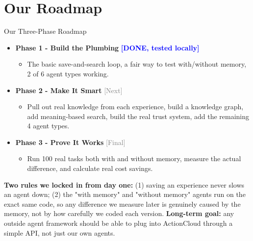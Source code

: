 \documentclass{beamer}
\begin{document}
\section{Our Roadmap}
\begin{frame}{Our Three-Phase Roadmap}
    \begin{itemize}
        \item \textbf{Phase 1 - Build the Plumbing} \hfill \textcolor{blue}{\textbf{[DONE, tested locally]}}
        \begin{itemize}\small
            \item The basic save-and-search loop, a fair way to test with/without memory, 2 of 6 agent types working.
        \end{itemize}
        \item \textbf{Phase 2 - Make It Smart} \hfill \textcolor{gray}{[Next]}
        \begin{itemize}\small
            \item Pull out real knowledge from each experience, build a knowledge graph, add meaning-based search, build the real trust system, add the remaining 4 agent types.
        \end{itemize}
        \item \textbf{Phase 3 - Prove It Works} \hfill \textcolor{gray}{[Final]}
        \begin{itemize}\small
            \item Run 100 real tasks both with and without memory, measure the actual difference, and calculate real cost savings.
        \end{itemize}
    \end{itemize}
    \vspace{0.15cm}
    \footnotesize \textbf{Two rules we locked in from day one:} (1) saving an experience never slows an agent down; (2) the "with memory" and "without memory" agents run on the exact same code, so any difference we measure later is genuinely caused by the memory, not by how carefully we coded each version. \textbf{Long-term goal:} any outside agent framework should be able to plug into ActionCloud through a simple API, not just our own agents.
\end{frame}
\end{document}
